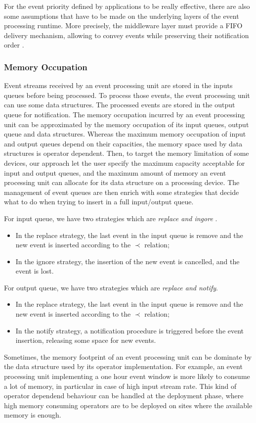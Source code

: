 \documentclass[a4paper,twoside]{article}
\begin{document}
For the event priority defined by applications to be really effective, there are also some assumptions that have to be made on the underlying layers of the event processing runtime. More precisely, the middleware layer must provide a FIFO delivery mechanism, allowing to convey events while preserving their notification order \cite{Chockler2001,Malekpour2011}.
\subsubsection{Memory Occupation}
Event streams received by an event processing unit are stored in the inputs queues before being processed. To process those events, the event processing unit can use some data structures. The processed events are stored in the output queue for notification. The memory occupation incurred by an event processing unit can be approximated by the memory occupation of its input queues, output queue and data structures. Whereas the maximum memory occupation of input and output queues depend on their capacities, the memory space used by data structures is operator dependent. Then, to target the memory limitation of some devices, our approach let the user specify the maximum capacity acceptable for input and output queues, and the maximum amount of memory an event processing unit can allocate for its data structure on a processing device. The management of event queues are then enrich with some strategies that decide what to do when trying to insert in a full input/output queue.

For input queue, we have two strategies which are \textit{replace and ingore }.
\begin{itemize}
\item In the replace strategy, the last event in the input queue is remove and the new event is inserted according to the $\prec$ relation;
\item In the ignore strategy, the insertion of the new event is cancelled, and the event is lost.
\end{itemize} 

For output queue, we have two strategies which are \textit{replace and notify}.
\begin{itemize}
\item In the replace strategy, the last event in the input queue is remove and the new event is inserted according to the $\prec$ relation;
\item In the notify strategy, a notification procedure is triggered before the event insertion, releasing some space for new events. 
\end{itemize} 
Sometimes, the memory footprint of an event processing unit can be dominate by the data structure used by its operator implementation. For example, an event processing unit implementing a one hour event window is more likely to consume a lot of memory, in particular in case of high input stream rate. This kind of operator dependend behaviour can be handled at the deployment phase, where high memory consuming operators are to be deployed on sites where the available memory is enough.    
\end{document}

